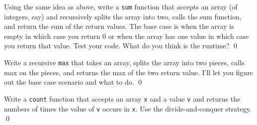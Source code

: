 \newpage
\begin{ex}
Using the same idea as above, write a \verb!sum! function
that accepts an array (of integers, say) and recursively
splits the array into two, calls the sum function, and return the 
sum of the return values.
The base case is when the array is empty in which case you return 0
or when the array has one value in which case you return that value.
Test your code.
What do you think is the runtime?
\qed
\end{ex}


\newpage
\begin{ex}
Write a recursive \verb!max! that takes an array, splits the
array into two pieces, calls max on the pieces, and returns
the max of the two return value.
I'll let you figure out the base case scenario and what to do. 
\qed
\end{ex}


\newpage
\begin{ex}
Write a \verb!count! function that accepts an array \verb!x!
and a value \verb!v! and returns the numbers of times the value of
\verb!v! occurs in \verb!x!. 
Use the divide-and-conquer strategy.
\qed
\end{ex}


